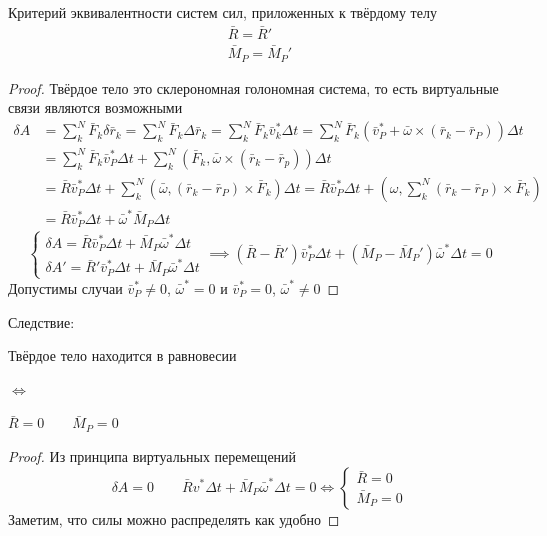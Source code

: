 \documentclass[crop=false]{standalone}
\begin{document}
\keypoint Критерий эквивалентности систем сил, приложенных к твёрдому телу
\[\boxed{\begin{matrix}\bar R = \bar R' \\ \bar M_P = \bar M_P'\end{matrix}}\]
\begin{proof}
    Твёрдое тело это склерономная голономная система, то есть виртуальные связи являются возможными
\[
\begin{aligned} 
    \delta A &= \sum_k^N \bar F_k \delta \bar r_k = \sum_k^N \bar F_k \Delta \bar r_k = \sum_k^N \bar F_k \bar v_k^* \Delta t = \sum_k^N \bar F_k (\bar v_P^* + \bar \omega \times (\bar r_k - \bar r_P)) \Delta t \\
    &= \sum_k^N \bar F_k \bar v_P^* \Delta t + \sum_k^N \left( \bar F_k ,\bar \omega \times (\bar r_k - \bar r_p)  \right)\Delta t  \\
    &= \bar R \bar v_P^* \Delta t + \sum_k^N (\bar \omega, (\bar r_k - \bar r_P) \times \bar F_k) \Delta t = \bar R \bar v_P^* \Delta t + \left(\omega , \sum_k^N (\bar r_k - \bar r_P) \times \bar F_k \right) \\
    &= \bar R \bar v_P^* \Delta t + \bar \omega^* \bar M_P \Delta t 
\end{aligned}
\]
\[
    \begin{cases}
        \delta A = \bar R \bar v_P^* \Delta t + \bar M_P \bar \omega^* \Delta t \\ \delta A' = \bar R' \bar v_P^* \Delta t + \bar M_P \bar \omega^* \Delta t 
    \end{cases} \implies \boxed{(\bar R - \bar R') \bar v_P^* \Delta t + (\bar M_P - \bar M_P') \bar \omega^* \Delta t = 0}
    \]
    Допустимы случаи $\bar v_P^* \neq 0$, $\bar \omega^* = 0$ и $\bar v_P^* = 0$, $\bar \omega^* \neq 0$
\end{proof}

Следствие: 

Твёрдое тело находится в равновесии 

$\iff$

$\bar R = 0 \qquad  \bar M_P = 0$
\begin{proof}
    Из принципа виртуальных перемещений 
    \[\delta A = 0 \qquad \bar R v^* \Delta t + \bar M_P \bar \omega^* \Delta t = 0 \iff \begin{cases}
        \bar R = 0 \\ 
        \bar M_P = 0
    \end{cases}\]
    Заметим, что силы можно распределять как удобно %
\end{proof}
\end{document}
